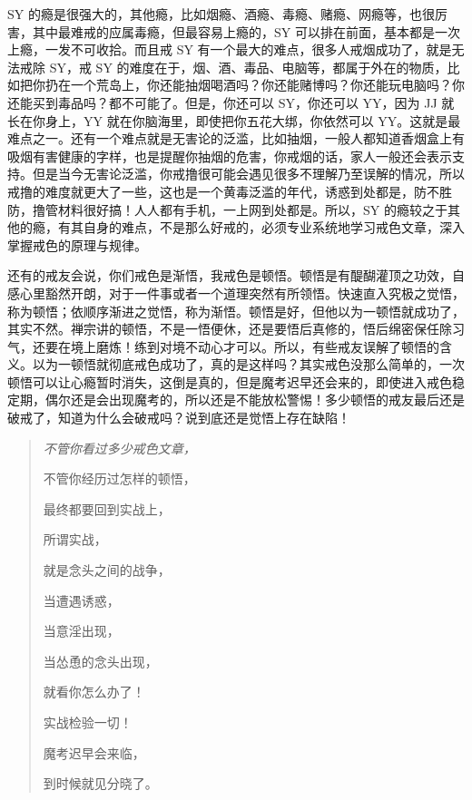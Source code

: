 \documentclass{ctexart}
\begin{document}
SY 的瘾是很强大的，其他瘾，比如烟瘾、酒瘾、毒瘾、赌瘾、网瘾等，也很厉害，其中最难戒的应属毒瘾，但最容易上瘾的，SY 可以排在前面，基本都是一次上瘾，一发不可收拾。而且戒 SY 有一个最大的难点，很多人戒烟成功了，就是无法戒除 SY，戒 SY 的难度在于，烟、酒、毒品、电脑等，都属于外在的物质，比如把你扔在一个荒岛上，你还能抽烟喝酒吗？你还能赌博吗？你还能玩电脑吗？你还能买到毒品吗？都不可能了。但是，你还可以 SY，你还可以 YY，因为 JJ 就长在你身上，YY 就在你脑海里，即使把你五花大绑，你依然可以 YY。这就是最难点之一。还有一个难点就是无害论的泛滥，比如抽烟，一般人都知道香烟盒上有吸烟有害健康的字样，也是提醒你抽烟的危害，你戒烟的话，家人一般还会表示支持。但是当今无害论泛滥，你戒撸很可能会遇见很多不理解乃至误解的情况，所以戒撸的难度就更大了一些，这也是一个黄毒泛滥的年代，诱惑到处都是，防不胜防，撸管材料很好搞！人人都有手机，一上网到处都是。所以，SY 的瘾较之于其他的瘾，有其自身的难点，不是那么好戒的，必须专业系统地学习戒色文章，深入掌握戒色的原理与规律。

还有的戒友会说，你们戒色是渐悟，我戒色是顿悟。顿悟是有醍醐灌顶之功效，自感心里豁然开朗，对于一件事或者一个道理突然有所领悟。快速直入究极之觉悟，称为顿悟；依顺序渐进之觉悟，称为渐悟。顿悟是好，但他以为一顿悟就成功了，其实不然。禅宗讲的顿悟，不是一悟便休，还是要悟后真修的，悟后绵密保任除习气，还要在境上磨炼！练到对境不动心才可以。所以，有些戒友误解了顿悟的含义。以为一顿悟就彻底戒色成功了，真的是这样吗？其实戒色没那么简单的，一次顿悟可以让心瘾暂时消失，这倒是真的，但是魔考迟早还会来的，即使进入戒色稳定期，偶尔还是会出现魔考的，所以还是不能放松警惕！多少顿悟的戒友最后还是破戒了，知道为什么会破戒吗？说到底还是觉悟上存在缺陷！

\begin{multicols}{2}
    \begin{quotation}\it
        不管你看过多少戒色文章，

        不管你经历过怎样的顿悟，

        最终都要回到实战上，

        所谓实战，

        就是念头之间的战争，

        当遭遇诱惑，

        当意淫出现，

        当怂恿的念头出现，

        就看你怎么办了！

        实战检验一切！

        魔考迟早会来临，

        到时候就见分晓了。
    \end{quotation}
\end{multicols}
\end{document}
